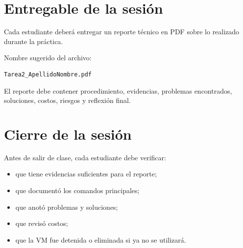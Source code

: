 \documentclass[
  coursetitle={Cómputo Nube y Tecnologías Emergentes},
  coursehours={96},
  coursedate={Verano 2026},
  doctype={Práctica},
  otherlangs={english,french},
  authorname={Lázaro},
  authorsurname={Bustio-Martínez},
  authortitle={PhD},
  role={Profesor Investigador},
  email={lbustio@inaoe.mx},
  phone={5559504000},
  ext={7459},
  institution={Instituto Nacional de Astrofísica, Óptica y Electrónica (INAOE)},
  department={Maestría en Ciencias en Tecnologías de Seguridad},
  address={Luis Enrique Erro 1, Sta. Ma. Tonantzintla, San Andrés Cholula, CP 72840, Puebla, México},
  margin={0.5in}
]{../../lbustio_lecture_notes}
\begin{document}
\section{Entregable de la sesión}

Cada estudiante deberá entregar un reporte técnico en PDF sobre lo realizado durante la práctica.

Nombre sugerido del archivo:

\begin{lstlisting}
Tarea2_ApellidoNombre.pdf
\end{lstlisting}

El reporte debe contener procedimiento, evidencias, problemas encontrados, soluciones, costos, riesgos y reflexión final.

\section{Cierre de la sesión}

Antes de salir de clase, cada estudiante debe verificar:

\begin{itemize}
    \item que tiene evidencias suficientes para el reporte;
    \item que documentó los comandos principales;
    \item que anotó problemas y soluciones;
    \item que revisó costos;
    \item que la VM fue detenida o eliminada si ya no se utilizará.
\end{itemize}
\end{document}
